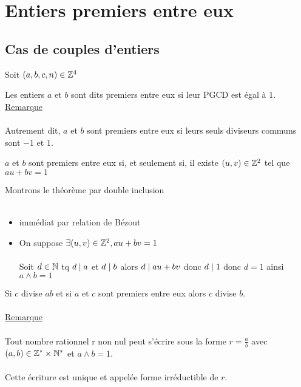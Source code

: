 \section{Entiers premiers entre eux}
\subsection{Cas de couples d’entiers}
Soit \((a, b, c, n) \in \mathbb{Z}^4\)

\begin{defi}
	Les entiers \(a\) et \(b\) sont dits premiers entre eux si leur PGCD est égal à \(1\).
	\underline{Remarque}\\~\\
	Autrement dit, \(a\) et \(b\) sont premiers entre eux si leurs seuls diviseurs communs sont \(-1\) et \(1\).
\end{defi}

\begin{theo}
	\(a\) et \(b\) sont premiers entre eux si, et seulement si, il existe \((u, v) \in \mathbb{Z}^2\) tel que \(au + bv = 1\)
\end{theo}

\begin{dem}
	Montrons le théorème par double inclusion\\~\\
	\begin{itemize}
		\item \impdir immédiat par relation de Bézout
		\item \imprec On suppose \(\exists (u,v)\in \mathbb{Z}^2,au+bv = 1\)\\~\\
		      Soit \(d \in \mathbb{N}\) tq \(d \mid a\) et \(d \mid b\) alors \(d\mid au+bv\) donc \(d \mid 1\) donc \(d=1\) ainsi \(a\wedge b = 1\)

	\end{itemize}
\end{dem}

\begin{theo}
	Si \(c\) divise \(ab\) et si \(a\) et \(c\) sont premiers entre eux alors \(c\) divise \(b\).\\~\\
	\underline{Remarque}\\~\\
	Tout nombre rationnel r non nul peut s’écrire sous la forme \(r = \frac{a}{b}\) avec \((a, b) \in \mathbb{Z}^* \times \mathbb{N}^* \) et \(a \wedge b = 1\).\\~\\
	Cette écriture est unique et appelée forme irréductible de \(r\).
\end{theo}

